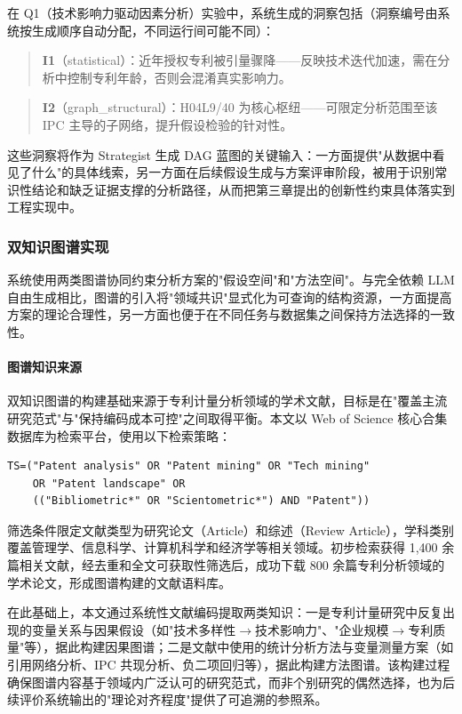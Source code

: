 在 Q1（技术影响力驱动因素分析）实验中，系统生成的洞察包括（洞察编号由系统按生成顺序自动分配，不同运行间可能不同）：

\begin{quote}
\textbf{I1}（statistical）：近年授权专利被引量骤降——反映技术迭代加速，需在分析中控制专利年龄，否则会混淆真实影响力。
\end{quote}

\begin{quote}
\textbf{I2}（graph\_structural）：H04L9/40 为核心枢纽——可限定分析范围至该 IPC 主导的子网络，提升假设检验的针对性。
\end{quote}

这些洞察将作为 Strategist 生成 DAG 蓝图的关键输入：一方面提供"从数据中看见了什么"的具体线索，另一方面在后续假设生成与方案评审阶段，被用于识别常识性结论和缺乏证据支撑的分析路径，从而把第三章提出的创新性约束具体落实到工程实现中。

\subsubsection{双知识图谱实现}

系统使用两类图谱协同约束分析方案的"假设空间"和"方法空间"\cite{pan2024unifying,liu2016knowledge}。与完全依赖 LLM 自由生成相比，图谱的引入将"领域共识"显式化为可查询的结构资源，一方面提高方案的理论合理性，另一方面也便于在不同任务与数据集之间保持方法选择的一致性。

\paragraph{图谱知识来源}

双知识图谱的构建基础来源于专利计量分析领域的学术文献，目标是在"覆盖主流研究范式"与"保持编码成本可控"之间取得平衡。本文以 Web of Science 核心合集数据库为检索平台，使用以下检索策略：

\begin{lstlisting}[basicstyle=\ttfamily\small,frame=single,breaklines=true]
TS=("Patent analysis" OR "Patent mining" OR "Tech mining"
    OR "Patent landscape" OR
    (("Bibliometric*" OR "Scientometric*") AND "Patent"))
\end{lstlisting}

筛选条件限定文献类型为研究论文（Article）和综述（Review Article），学科类别覆盖管理学、信息科学、计算机科学和经济学等相关领域。初步检索获得 1,400 余篇相关文献，经去重和全文可获取性筛选后，成功下载 800 余篇专利分析领域的学术论文，形成图谱构建的文献语料库。

在此基础上，本文通过系统性文献编码提取两类知识：一是专利计量研究中反复出现的变量关系与因果假设（如"技术多样性$\rightarrow$技术影响力"、"企业规模$\rightarrow$专利质量"等），据此构建因果图谱；二是文献中使用的统计分析方法与变量测量方案（如引用网络分析、IPC 共现分析、负二项回归等），据此构建方法图谱\cite{basberg1987patents,trajtenberg1990penny,griliches1990patent,zhu2014patent}。该构建过程确保图谱内容基于领域内广泛认可的研究范式，而非个别研究的偶然选择，也为后续评价系统输出的"理论对齐程度"提供了可追溯的参照系。

